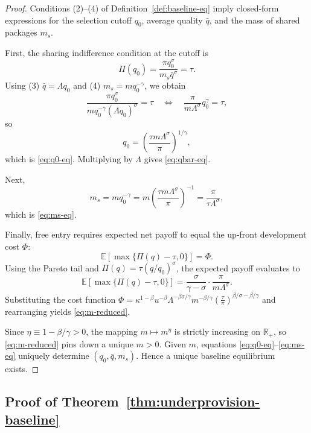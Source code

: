 \documentclass[11pt,a4paper]{article}
\theoremstyle{definition}
\theoremstyle{remark}
\begin{document}
\begin{proof}
Conditions (2)--(4) of Definition~\ref{def:baseline-eq} imply closed-form expressions for the selection cutoff $q_0$, average quality $\bar{q}$, and the mass of shared packages $m_s$.

First, the sharing indifference condition at the cutoff is
\[
\Pi(q_0) = \frac{\pi q_0^\sigma}{m_s \bar{q}^\sigma} = \tau.
\]
Using (3) $\bar{q}=\Lambda q_0$ and (4) $m_s=m q_0^{-\gamma}$, we obtain
\[
\frac{\pi q_0^\sigma}{m q_0^{-\gamma} (\Lambda q_0)^\sigma} = \tau
\quad\Longleftrightarrow\quad
\frac{\pi}{m\Lambda^\sigma} q_0^{\gamma} = \tau,
\]
so
\[
q_0 = \left(\frac{\tau m \Lambda^\sigma}{\pi}\right)^{1/\gamma},
\]
which is \eqref{eq:q0-eq}. Multiplying by $\Lambda$ gives \eqref{eq:qbar-eq}.

Next,
\[
m_s = m q_0^{-\gamma} = m \left(\frac{\tau m \Lambda^\sigma}{\pi}\right)^{-1} = \frac{\pi}{\tau\Lambda^\sigma},
\]
which is \eqref{eq:ms-eq}.

Finally, free entry requires expected net payoff to equal the up-front development cost $\Phi$:
\[
\mathbb{E}[\max\{\Pi(q)-\tau,0\}] = \Phi.
\]
Using the Pareto tail and $\Pi(q)=\tau (q/q_0)^\sigma$, the expected payoff evaluates to
\[
\mathbb{E}[\max\{\Pi(q)-\tau,0\}] = \frac{\sigma}{\gamma-\sigma}\cdot \frac{\pi}{m\Lambda^\sigma}.
\]
Substituting the cost function $\Phi=\kappa^{1-\beta}u^{-\beta}\Lambda^{-\beta\sigma/\gamma}m^{-\beta/\gamma}\left(\frac{\tau}{\pi}\right)^{\beta/\sigma-\beta/\gamma}$ and rearranging yields \eqref{eq:m-reduced}.

Since $\eta\equiv 1-\beta/\gamma>0$, the mapping $m\mapsto m^{\eta}$ is strictly increasing on $\mathbb{R}_+$, so \eqref{eq:m-reduced} pins down a unique $m>0$. Given $m$, equations \eqref{eq:q0-eq}--\eqref{eq:ms-eq} uniquely determine $(q_0,\bar{q},m_s)$. Hence a unique baseline equilibrium exists.
\end{proof}

\subsection{Proof of Theorem~\ref{thm:underprovision-baseline}}
\end{document}
